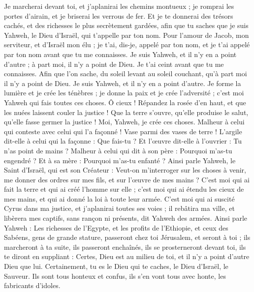 \begin{multicols}{2}
Je marcherai devant toi, et j'aplanirai les chemins montueux ; je romprai les portes d'airain, et je briserai les verrous de fer. Et je te donnerai des trésors cachés, et des richesses le plus secrètement gardées, afin que tu saches que je suis Yahweh, le Dieu d'Israël, qui t'appelle par ton nom.
Pour l'amour de Jacob, mon serviteur, et d'Israël mon élu ; je t'ai, dis-je, appelé par ton nom, et je t'ai appelé par ton nom avant que tu me connaisses.
Je suis Yahweh, et il n'y en a point d'autre ; à part moi, il n'y a point de Dieu. Je t'ai ceint avant que tu me connaisses.
Afin que l'on sache, du soleil levant au soleil couchant, qu'à part moi il n'y a point de Dieu. Je suis Yahweh, et il n'y en a point d'autre.
Je forme la lumière et je crée les ténèbres ; je donne la paix et je crée l'adversité ; c'est moi Yahweh qui fais toutes ces choses.
Ô cieux ! Répandez la rosée d'en haut, et que les nuées laissent couler la justice ! Que la terre s'ouvre, qu'elle produise le salut, qu'elle fasse germer la justice ! Moi, Yahweh, je crée ces choses.
Malheur à celui qui conteste avec celui qui l'a façonné ! Vase parmi des vases de terre ! L'argile dit-elle à celui qui la façonne : Que fais-tu ? Et l'œuvre dit-elle à l'ouvrier : Tu n'as point de mains ?
Malheur à celui qui dit à son père : Pourquoi m'as-tu engendré ? Et à sa mère : Pourquoi m'as-tu enfanté ?
Ainsi parle Yahweh, le Saint d'Israël, qui est son Créateur : Veut-on m'interroger sur les choses à venir, me donner des ordres sur mes fils, et sur l'œuvre de mes mains ?
C'est moi qui ai fait la terre et qui ai créé l'homme sur elle ; c'est moi qui ai étendu les cieux de mes mains, et qui ai donné la loi à toute leur armée.
C'est moi qui ai suscité Cyrus dans ma justice, et j'aplanirai toutes ses voies ; il rebâtira ma ville, et libèrera mes captifs, sans rançon ni présents, dit Yahweh des armées.
Ainsi parle Yahweh : Les richesses de l'Egypte, et les profits de l'Ethiopie, et ceux des Sabéens, gens de grande stature, passeront chez toi Jérusalem, et seront à toi ; ils marcheront à ta suite, ils passeront enchaînés, ils se prosterneront devant toi, ils te diront en suppliant : Certes, Dieu est au milieu de toi, et il n'y a point d'autre Dieu que lui.
Certainement, tu es le Dieu qui te caches, le Dieu d'Israël, le Sauveur.
Ils sont tous honteux et confus, ils s'en vont tous avec honte, les fabricants d'idoles.

\end{multicols}
